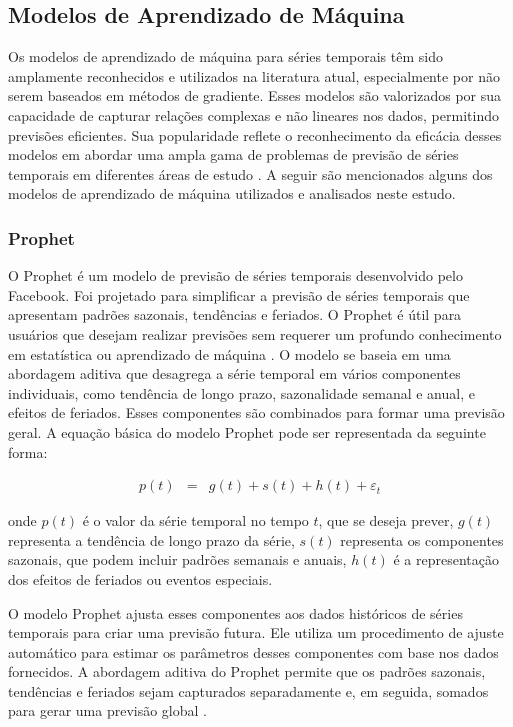  \subsection{Modelos de Aprendizado de M\'aquina}\label{subsec:reg}
 
 Os modelos de aprendizado de máquina para séries temporais têm sido amplamente reconhecidos e utilizados na literatura atual, especialmente por não serem baseados em métodos de gradiente. Esses modelos são valorizados por sua capacidade de capturar relações complexas e não lineares nos dados, permitindo previsões eficientes. Sua popularidade reflete o reconhecimento da eficácia desses modelos em abordar uma ampla gama de problemas de previsão de séries temporais em diferentes áreas de estudo \cite{al2021machine, sen2022machine, kheiri2023sentimentgpt}. A seguir são mencionados alguns dos modelos de aprendizado de máquina utilizados e analisados neste estudo.
 
  \subsubsection{Prophet}
 
 O Prophet é um modelo de previsão de séries temporais desenvolvido pelo Facebook. Foi projetado para simplificar a previsão de séries temporais que apresentam padrões sazonais, tendências e feriados. O Prophet é útil para usuários que desejam realizar previsões sem requerer um profundo conhecimento em estatística ou aprendizado de máquina \cite{en16031371}. O modelo se baseia em uma abordagem aditiva que desagrega a série temporal em vários componentes individuais, como tendência de longo prazo, sazonalidade semanal e anual, e efeitos de feriados. Esses componentes são combinados para formar uma previsão geral.  A equação básica do modelo Prophet pode ser representada da seguinte forma:
 
 \begin{eqnarray}
 	p(t) &=& g(t) + s(t) + h(t) + \varepsilon_t 
 \end{eqnarray}
 
 \noindent onde $ p(t) $ é o valor da série temporal no tempo $ t $, que se deseja prever, $ g(t) $ representa a tendência de longo prazo da série, $ s(t) $ representa os componentes sazonais, que podem incluir padrões semanais e anuais, $ h(t) $ é a representação dos efeitos de feriados ou eventos especiais.
  
 O modelo Prophet ajusta esses componentes aos dados históricos de séries temporais para criar uma previsão futura. Ele utiliza um procedimento de ajuste automático para estimar os parâmetros desses componentes com base nos dados fornecidos. A abordagem aditiva do Prophet permite que os padrões sazonais, tendências e feriados sejam capturados separadamente e, em seguida, somados para gerar uma previsão global \cite{2-s2.0-85092514286}.
 
